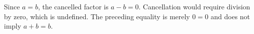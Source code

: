 Since $a=b$, the cancelled factor is $a-b=0$. Cancellation would require division by zero, which is undefined. The preceding equality is merely $0=0$ and does not imply $a+b=b$.
